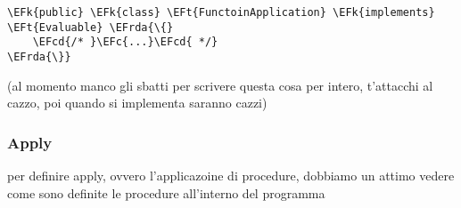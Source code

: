 \documentclass[11pt]{article}
\newcommand{\EFc}[1]{\textcolor{EFc}{#1}} %
\newcommand{\EFcd}[1]{\textcolor{EFcd}{#1}} %
\newcommand{\EFk}[1]{\textcolor{EFk}{#1}} %
\newcommand{\EFt}[1]{\textcolor{EFt}{#1}} %
\newcommand{\EFrda}[1]{\textcolor{EFrda}{#1}} %
\begin{document}
\begin{enumerate}
\begin{enumerate}
\begin{Code}
\begin{Verbatim}
\EFk{public} \EFk{class} \EFt{FunctoinApplication} \EFk{implements} \EFt{Evaluable} \EFrda{\{}
    \EFcd{/* }\EFc{...}\EFcd{ */}
\EFrda{\}}
\end{Verbatim}
\end{Code}

(al momento manco gli sbatti per scrivere questa cosa per intero, t'attacchi al cazzo, poi quando si implementa saranno cazzi)
\end{enumerate}
\end{enumerate}

\subsubsection{Apply}
\label{sec:orgf2297d5}
per definire apply, ovvero l'applicazoine di procedure, dobbiamo un attimo vedere come sono definite le procedure all'interno del programma
\end{document}

